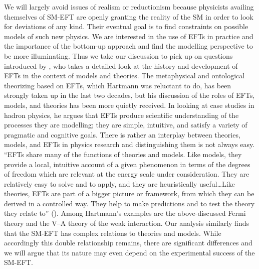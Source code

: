 We will largely avoid issues of realism or reductionism because physicists availing themselves of SM-EFT are openly granting the reality of the SM in order to look for deviations of any kind.
Their eventual goal is to find constraints on possible models of such new physics. 
We are interested in the use of EFTs in practice and the importance of the bottom-up approach and find the modelling perspective to be more illuminating.
Thus we take our discussion to pick up on questions introduced by \citet{hartmann2001}, who takes a detailed look at the history and development of EFTs in the context of models and theories.
The metaphysical and ontological theorizing based on EFTs, which Hartmann was reluctant to do, has been strongly taken up in the last two decades, but his discussion of the roles of EFTs, models, and theories has been more quietly received.
In looking at case studies in hadron physics, he argues that EFTs produce scientific understanding of the processes they are modelling; they are simple, intuitive, and satisfy a variety of pragmatic and cognitive goals. 
There is rather an interplay between theories, models, and EFTs in physics research and distinguishing them is not always easy. 
``EFTs share many of the functions of theories and models. Like models, they provide a local, intuitive account of a given phenomenon in terms of the degrees of freedom which are relevant at the energy scale under consideration. They are relatively easy to solve and to apply, and they are heuristically useful\ldots Like theories, EFTs are part of a bigger picture or framework, from which they can be derived in a controlled way. They help to make predictions and to test the theory they relate to'' (\citeyear[p.~294]{hartmann2001}). 
Among Hartmann's examples are the above-discussed Fermi theory and the V--A theory of the weak interaction. 
Our analysis similarly finds that the SM-EFT has complex relations to theories and models. 
While accordingly this double relationship remains, there are significant differences and we will argue that its nature may even depend on the experimental success of the SM-EFT.


